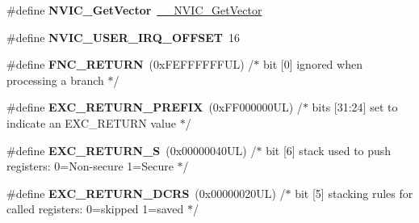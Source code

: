 \begin{DoxyCompactItemize}
\mbox{\label{group___c_m_s_i_s___core___n_v_i_c_functions_ga955eb1c33a3dcc62af11a8385e8c0fc8}} 
\#define {\bfseries N\+V\+I\+C\+\_\+\+Get\+Vector}~\hyperlink{group___c_m_s_i_s___core___n_v_i_c_functions_ga44b665d2afb708121d9b10c76ff00ee5}{\+\_\+\+\_\+\+N\+V\+I\+C\+\_\+\+Get\+Vector}
\item 
\mbox{\label{group___c_m_s_i_s___core___n_v_i_c_functions_ga8045d905a5ca57437d8e6f71ffcb6df5}} 
\#define {\bfseries N\+V\+I\+C\+\_\+\+U\+S\+E\+R\+\_\+\+I\+R\+Q\+\_\+\+O\+F\+F\+S\+ET}~16
\item 
\mbox{\label{group___c_m_s_i_s___core___n_v_i_c_functions_gabaa62910bf89acc186ae998c611e64ab}} 
\#define {\bfseries F\+N\+C\+\_\+\+R\+E\+T\+U\+RN}~(0x\+F\+E\+F\+F\+F\+F\+F\+F\+U\+L)     /$\ast$ bit \mbox{[}0\mbox{]} ignored when processing a branch                             $\ast$/
\item 
\mbox{\label{group___c_m_s_i_s___core___n_v_i_c_functions_ga99e0c1c19f050880a8bd827a7f420bec}} 
\#define {\bfseries E\+X\+C\+\_\+\+R\+E\+T\+U\+R\+N\+\_\+\+P\+R\+E\+F\+IX}~(0x\+F\+F000000\+U\+L)     /$\ast$ bits \mbox{[}31\+:24\mbox{]} set to indicate an E\+X\+C\+\_\+\+R\+E\+T\+U\+R\+N value                     $\ast$/
\item 
\mbox{\label{group___c_m_s_i_s___core___n_v_i_c_functions_ga88711355d0196b1ffeb18c33e2c95360}} 
\#define {\bfseries E\+X\+C\+\_\+\+R\+E\+T\+U\+R\+N\+\_\+S}~(0x00000040\+U\+L)     /$\ast$ bit \mbox{[}6\mbox{]} stack used to push registers\+: 0=\+Non-\/secure 1=\+Secure          $\ast$/
\item 
\mbox{\label{group___c_m_s_i_s___core___n_v_i_c_functions_ga0a0f2c03b4aef2c02bdae044bda1324b}} 
\#define {\bfseries E\+X\+C\+\_\+\+R\+E\+T\+U\+R\+N\+\_\+\+D\+C\+RS}~(0x00000020\+U\+L)     /$\ast$ bit \mbox{[}5\mbox{]} stacking rules for called registers\+: 0=skipped 1=saved       $\ast$/
\item 
\mbox{\label{group___c_m_s_i_s___core___n_v_i_c_functions_ga342b51c3eec59822bf206e24ef881a9e}} 

\end{DoxyCompactItemize}
